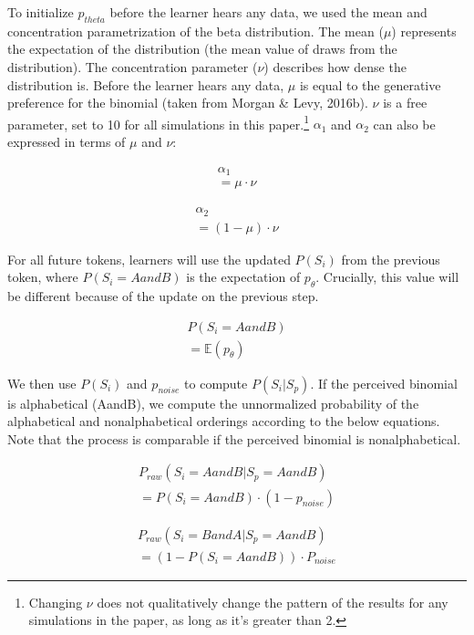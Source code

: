 \documentclass[10pt, letterpaper]{article}
\begin{document}
To initialize \(p_{theta}\) before the learner hears any data, we used
the mean and concentration parametrization of the beta distribution. The
mean (\(\mu\)) represents the expectation of the distribution (the mean
value of draws from the distribution). The concentration parameter
(\(\nu\)) describes how dense the distribution is. Before the learner
hears any data, \(\mu\) is equal to the generative preference for the
binomial (taken from Morgan \& Levy, 2016b). \(\nu\) is a free
parameter, set to 10 for all simulations in this paper.\footnote{Changing
  \(\nu\) does not qualitatively change the pattern of the results for
  any simulations in the paper, as long as it's greater than 2.}
\(\alpha_1\) and \(\alpha_2\) can also be expressed in terms of \(\mu\)
and \(\nu\):

\begin{multline}
\label{eq:alpha1}
\alpha_1 \\ = \mu \cdot \nu
\end{multline}

\begin{multline}
\label{eq:alpha2}
\alpha_2 \\ = (1-\mu) \cdot \nu
\end{multline}

For all future tokens, learners will use the updated \(P(S_i)\) from the
previous token, where \(P(S_i = AandB)\) is the expectation of
\(p_\theta\). Crucially, this value will be different because of the
update on the previous step.

\begin{multline}
\label{eq:expectationptheta}
P(S_i = AandB) \\ = \mathbb{E}(p_\theta)
\end{multline}

We then use \(P(S_i)\) and \(p_{noise}\) to compute \(P(S_i|S_p)\). If
the perceived binomial is alphabetical (AandB), we compute the
unnormalized probability of the alphabetical and nonalphabetical
orderings according to the below equations. Note that the process is
comparable if the perceived binomial is nonalphabetical.

\begin{multline}
\label{eq:praw}
P_{raw}(S_i = AandB|S_p = AandB) \\ = P(S_i = AandB) \cdot (1 -  p_{noise})
\end{multline}

\begin{multline}
\label{eq:prawtwo}
P_{raw}(S_i = BandA|S_p = AandB) \\ = (1 - P(S_i = AandB)) \cdot P_{noise}
\end{multline}
\end{document}
